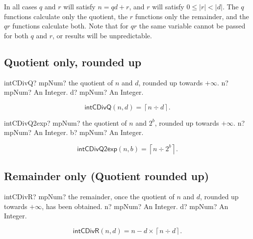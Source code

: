 In all cases $q$ and $r$ will satisfy $n = qd + r$, and $r$ will satisfy $0 \leq |r| < |d|$.
The $q$ functions calculate only the quotient, the $r$ functions only the remainder, and the $qr$ functions calculate both. Note that for $qr$ the same variable cannot be passed for both $q$ and $r$, or results will be unpredictable.


\subsection{Quotient only, rounded up}

\begin{mpFunctionsExtract}
	\mpFunctionTwo
	{intCDivQ? mpNum? the quotient of $n$ and $d$, rounded up towards $+\infty$.}
	{n? mpNum? An Integer.}
	{d? mpNum? An Integer.}
\end{mpFunctionsExtract}

\begin{equation}
	\label{eq:intCDivQ}
	\textsf{intCDivQ}(n, d) =\left\lceil n \div d\right\rceil.
\end{equation}

\vspace{0.3cm}
\begin{mpFunctionsExtract}
	\mpFunctionTwo
	{intCDivQ2exp? mpNum? the quotient of $n$ and $2^b$, rounded up towards $+\infty$.}
	{n? mpNum? An Integer.}
	{b? mpNum? An Integer.}
\end{mpFunctionsExtract}

\begin{equation}
	\label{eq:intCDivQ2exp}
	\textsf{intCDivQ2exp}(n, b) =\left\lceil n \div 2^b\right\rceil.
\end{equation}





\subsection{Remainder only (Quotient rounded up)}

\begin{mpFunctionsExtract}
	\mpFunctionTwo
	{intCDivR? mpNum? the remainder, once the quotient of $n$ and $d$, rounded up towards $+\infty$, has been obtained.}
	{n? mpNum? An Integer.}
	{d? mpNum? An Integer.}
\end{mpFunctionsExtract}

\begin{equation}
	\label{eq:intCDivR}
	\textsf{intCDivR}(n, d) =n - d \times \left\lceil n \div d\right\rceil.
\end{equation}

